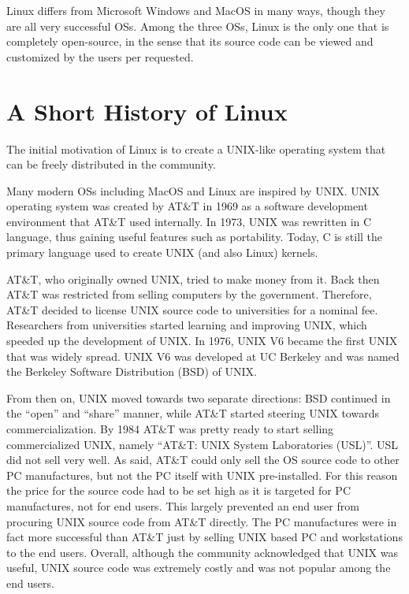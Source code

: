 Linux differs from Microsoft Windows and MacOS in many ways, though they are all very successful OSs. Among the three OSs, Linux is the only one that is completely open-source, in the sense that its source code can be viewed and customized by the users per requested.

\section{A Short History of Linux}

The initial motivation of Linux is to create a UNIX-like operating system that can be freely distributed in the community.

Many modern OSs including MacOS and Linux are inspired by UNIX. UNIX operating system was created by AT\&T in 1969 as a software development environment that AT\&T used internally. In 1973, UNIX was rewritten in C language, thus gaining useful features such as portability. Today, C is still the primary language used to create UNIX (and also Linux) kernels.

AT\&T, who originally owned UNIX, tried to make money from it. Back then AT\&T was restricted from selling computers by the government. Therefore, AT\&T decided to license UNIX source code to universities for a nominal fee. Researchers from universities started learning and improving UNIX, which speeded up the development of UNIX. In 1976, UNIX V6 became the first UNIX that was widely spread. UNIX V6 was developed at UC Berkeley and was named the Berkeley Software Distribution (BSD) of UNIX.

From then on, UNIX moved towards two separate directions: BSD continued in the ``open'' and ``share'' manner, while AT\&T started steering UNIX towards commercialization. By 1984 AT\&T was pretty ready to start selling commercialized UNIX, namely ``AT\&T: UNIX System Laboratories (USL)''. USL did not sell very well. As said, AT\&T could only sell the OS source code to other PC manufactures, but not the PC itself with UNIX pre-installed. For this reason the price for the source code had to be set high as it is targeted for PC manufactures, not for end users. This largely prevented an end user from procuring UNIX source code from AT\&T directly. The PC manufactures were in fact more successful than AT\&T just by selling UNIX based PC and workstations to the end users. Overall, although the community acknowledged that UNIX was useful, UNIX source code was extremely costly and was not popular among the end users.

